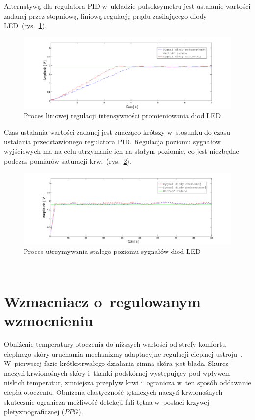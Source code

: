 Alternatywą dla regulatora PID w~układzie pulsoksymetru jest ustalanie wartości zadanej przez stopniową, liniową regulację prądu zasilającego diody 
LED~(rys.~\ref{rys:polka}).
\begin{figure}[!ht]
	\centerline{\includegraphics[scale = 0.38]{graphic/polka}}
	\caption{Proces liniowej regulacji intensywności promieniowania diod LED}
	\label{rys:polka}
\end{figure}

\noindent Czas ustalania wartości zadanej jest znacząco krótszy w~stosunku do czasu ustalania przedstawionego regulatora PID. Regulacja poziomu sygnałów
wyjściowych ma na celu utrzymanie ich na stałym poziomie, co jest niezbędne podczas pomiarów saturacji krwi~(rys.~\ref{rys:polka2}).
\begin{figure}[!ht]
	\centerline{\includegraphics[scale = 0.40]{graphic/polka2}}
	\caption{Proces utrzymywania stałego poziomu sygnałów diod LED}
	\label{rys:polka2}
\end{figure}\\

\section{Wzmacniacz o~regulowanym wzmocnieniu}
\label{sec:PGA}

Obniżenie temperatury otoczenia do niższych wartości od strefy komfortu cieplnego skóry uruchamia mechanizmy adaptacyjne regulacji cieplnej 
ustroju~\cite{SzGa11}. W~pierwszej fazie krótkotrwałego działania zimna skóra jest blada. Skurcz naczyń krwionośnych skóry i~tkanki podskórnej 
występujący pod wpływem niskich temperatur, zmniejsza przepływ krwi i~ogranicza w~ten sposób oddawanie ciepła otoczeniu. Obniżona elastyczność 
tętniczych naczyń krwionośnych skutecznie ogranicza możliwość detekcji fali tętna w~postaci krzywej pletyzmograficznej ($PPG$).

